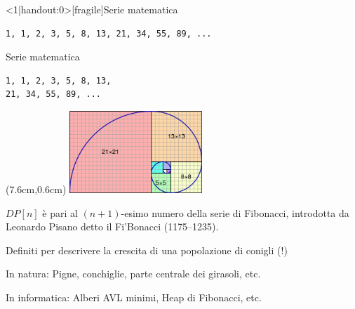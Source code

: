 \begin{frame}<1|handout:0>[fragile]{Serie matematica}

\vspace{-9pt}

\begin{lstlisting}
1, 1, 2, 3, 5, 8, 13, 21, 34, 55, 89, ...
\end{lstlisting}


\end{frame}


\begin{frame}[fragile]{Serie matematica}

\vspace{-9pt}

\begin{lstlisting}
1, 1, 2, 3, 5, 8, 13, 
21, 34, 55, 89, ...
\end{lstlisting}

\begin{textblock*}{5cm}(7.6cm,0.6cm) %
\includegraphics[width=5cm]{fibonacci.png}
\end{textblock*}

\begin{myboxtitle}
$\mathit{DP}[n]$ è pari al $(n+1)$-esimo numero della serie di Fibonacci, introdotta da Leonardo Pisano detto il Fi'Bonacci (1175--1235).
\end{myboxtitle}

\BIL
\item Definiti per descrivere la crescita di una popolazione di conigli (!)
\item In natura: Pigne, conchiglie, parte centrale dei girasoli, etc.
\item In informatica: Alberi AVL minimi, Heap di Fibonacci, etc.
\EIL

\end{frame}


